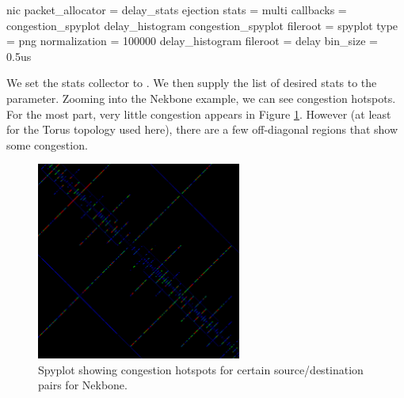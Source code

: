 \begin{ViFile}
nic {
 packet_allocator = delay_stats
 ejection {
  stats = multi
  callbacks = congestion_spyplot delay_histogram
  congestion_spyplot {
   fileroot = spyplot
   type = png
   normalization = 100000
  }
  delay_histogram {
   fileroot = delay
   bin_size = 0.5us
  }
 }
}
\end{ViFile}

We set the stats collector to .
We then supply the list of desired stats to the  parameter.
Zooming into the Nekbone example, we can see congestion hotspots.
For the most part, very little congestion appears in Figure \ref{fig:nekboneCongestionSpyplot}.
However (at least for the Torus topology used here),
there are a few off-diagonal regions that show some congestion.

\begin{figure}
\centering
\includegraphics[width=0.6\textwidth]{figures/congestionSpyplotNekbone}
\caption{Spyplot showing congestion hotspots for certain source/destination pairs for Nekbone.}
\label{fig:nekboneCongestionSpyplot}
\end{figure}



